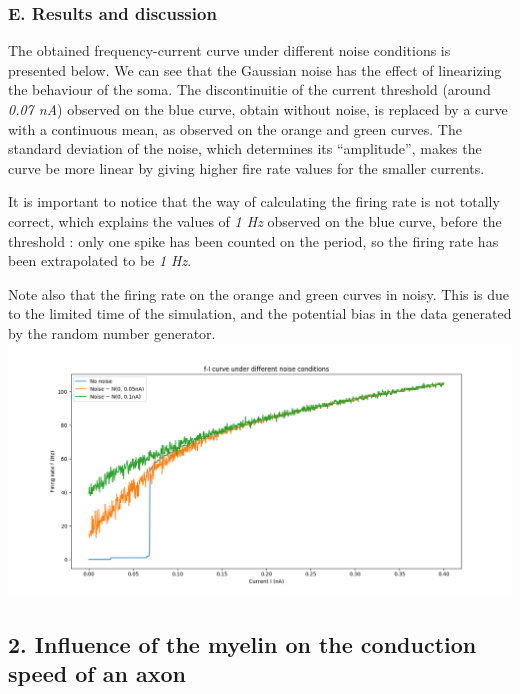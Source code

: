 \documentclass[]{article}
\begin{document}
\hypertarget{e.-results-and-discussion}{%
\subsubsection{E. Results and
discussion}\label{e.-results-and-discussion}}

The obtained frequency-current curve under different noise conditions is
presented below. We can see that the Gaussian noise has the effect of
linearizing the behaviour of the soma. The discontinuitie of the current
threshold (around \emph{0.07 nA}) observed on the blue curve, obtain
without noise, is replaced by a curve with a continuous mean, as
observed on the orange and green curves. The standard deviation of the
noise, which determines its ``amplitude'', makes the curve be more
linear by giving higher fire rate values for the smaller currents.

It is important to notice that the way of calculating the firing rate is
not totally correct, which explains the values of \emph{1 Hz} observed
on the blue curve, before the threshold : only one spike has been
counted on the period, so the firing rate has been extrapolated to be
\emph{1 Hz}.

Note also that the firing rate on the orange and green curves in noisy.
This is due to the limited time of the simulation, and the potential
bias in the data generated by the random number generator.\\
\includegraphics{f-I_under_noise.png}

\hypertarget{influence-of-the-myelin-on-the-conduction-speed-of-an-axon}{%
\subsection{2. Influence of the myelin on the conduction speed of an
axon}\label{influence-of-the-myelin-on-the-conduction-speed-of-an-axon}}
\end{document}
